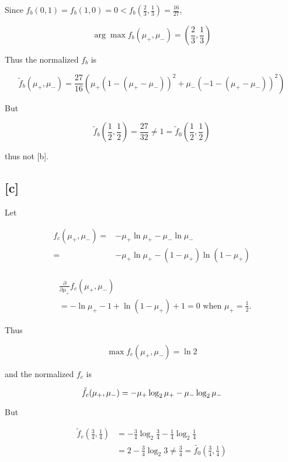 \documentclass[fleqn,a4paper,12pt]{article}
\begin{document}
Since $f_b(0, 1) = f_b(1, 0) = 0 < f_b(\frac{2}{3}, \frac{1}{3}) = \frac{16}{27}$,

\begin{equation*}
  \arg \max f_b(\mu_+, \mu_-) = (\frac{2}{3}, \frac{1}{3})
\end{equation*}

Thus the normalized $f_b$ is

\begin{equation*}
  \tilde{f}_b(\mu_+, \mu_-) = \frac{27}{16} (\mu_+(1 - (\mu_+ - \mu_-))^2 + \mu_-(-1 - (\mu_+ - \mu_-))^2)
\end{equation*}

But

\begin{equation*}
  \tilde{f}_b(\frac{1}{2}, \frac{1}{2}) = \frac{27}{32} \ne 1 = \tilde{f}_0(\frac{1}{2}, \frac{1}{2})
\end{equation*}

thus not [b].

\subsection*{[c]}

Let

\begin{align*}
  f_c(\mu_+, \mu_-) =
  &  - \mu_+ \ln \mu_+ - \mu_- \ln \mu_- \\
  =& - \mu_+ \ln \mu_+ - (1 - \mu_+) \ln (1 - \mu_+) \\
\end{align*}

\begin{align*}
  &\frac{\partial}{\partial \mu_+} f_c(\mu_+, \mu_-) \\
  &=  - \ln \mu_+ - 1 +  \ln (1 - \mu_+) + 1 = 0 \text{ when $\mu_+ = \frac{1}{2}$.}
\end{align*}

Thus

\begin{equation*}
  \max f_c(\mu_+, \mu_-) = \ln 2
\end{equation*}

and the normalized $f_c$ is

\begin{equation*}
  \tilde{f}_c(\mu_+, \mu_-) = - \mu_+ \log_2 \mu_+ - \mu_- \log_2 \mu_- \\  
\end{equation*}

But 

\begin{align*}
  \tilde{f}_c(\frac{3}{4}, \frac{1}{4})
  &= - \frac{3}{4} \log_2 \frac{3}{4} - \frac{1}{4} \log_2 \frac{1}{4} \\
  &= 2 -\frac{3}{4} \log_2 3 \ne \frac{3}{4} = \tilde{f_0}(\frac{3}{4}, \frac{1}{4})
\end{align*}
\end{document}

